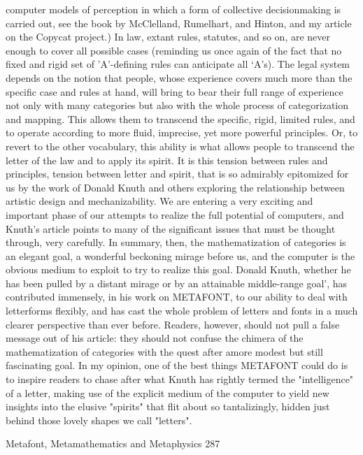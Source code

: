 computer models of perception in which a form of collective decisionmaking is carried
out, see the book by McClelland, Rumelhart, and Hinton, and my article on the Copycat
project.)
         In law, extant rules, statutes, and so on, are never enough to cover all possible
cases (reminding us once again of the fact that no fixed and rigid set of 'A'-defining rules
can anticipate all `A's). The legal system depends on the notion that people, whose
experience covers much more than the specific case and rules at hand, will bring to bear
their full range of experience not only with many categories but also with the whole
process of categorization and mapping. This allows them to transcend the specific, rigid,
limited rules, and to operate according to more fluid, imprecise, yet more powerful
principles. Or, to revert to the other vocabulary, this ability is what allows people to
transcend the letter of the law and to apply its spirit.
         It is this tension between rules and principles, tension between letter and spirit,
that
         is so admirably epitomized for us by the work of Donald Knuth and others
exploring the relationship between artistic design and mechanizability. We are entering a
very exciting and important phase of our attempts to realize the full potential of
computers, and Knuth's article points to many of the significant issues that must be
thought through, very carefully.
         In summary, then, the mathematization of categories is an elegant goal, a
wonderful beckoning mirage before us, and the computer is the obvious medium to
exploit to try to realize this goal. Donald Knuth, whether he has been pulled by a distant
mirage or by an attainable middle-range goal', has contributed immensely, in his work on
METAFONT, to our ability to deal with letterforms flexibly, and has cast the whole
problem of letters and fonts in a much clearer perspective than ever before. Readers,
however, should not pull a false message out of his article: they should not confuse the
chimera of the mathematization of categories with the quest after amore modest but still
fascinating goal. In my opinion, one of the best things METAFONT could do is to inspire
readers to chase after what Knuth has rightly termed the "intelligence" of a letter, making
use of the explicit medium of the computer to yield new insights into the elusive "spirits"
that flit about so tantalizingly, hidden just behind those lovely shapes we call "letters".




Metafont, Metamathematics and Metaphysics                                               287

